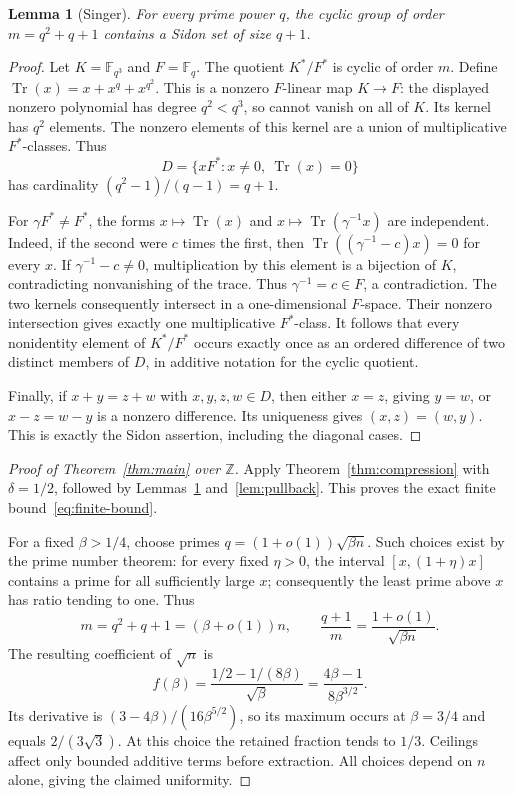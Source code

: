 \documentclass[11pt]{article}
\newtheorem{lemma}[theorem]{Lemma}
\theoremstyle{definition}
\theoremstyle{remark}
\newcommand{\Z}{\mathbb Z}
\newcommand{\F}{\mathbb F}
\DeclareMathOperator{\Tr}{Tr}
\begin{document}
\begin{lemma}[Singer]\label{lem:singer}
For every prime power $q$, the cyclic group of order $m=q^2+q+1$
contains a Sidon set of size $q+1$.
\end{lemma}
\begin{proof}
Let $K=\F_{q^3}$ and $F=\F_q$. The quotient $K^*/F^*$ is cyclic of
order $m$. Define $\Tr(x)=x+x^q+x^{q^2}$. This is a nonzero
$F$-linear map $K\to F$: the displayed nonzero polynomial has degree
$q^2<q^3$, so cannot vanish on all of $K$. Its kernel has $q^2$ elements.
The nonzero elements of this kernel are a union of multiplicative
$F^*$-classes. Thus
\[
D=\{xF^*:x\ne0,\ \Tr(x)=0\}
\]
has cardinality $(q^2-1)/(q-1)=q+1$.

For $\gamma F^*\ne F^*$, the forms $x\mapsto\Tr(x)$ and
$x\mapsto\Tr(\gamma^{-1}x)$ are independent. Indeed, if the second
were $c$ times the first, then
$\Tr((\gamma^{-1}-c)x)=0$ for every $x$. If $\gamma^{-1}-c\ne0$,
multiplication by this element is a bijection of $K$, contradicting
nonvanishing of the trace. Thus $\gamma^{-1}=c\in F$, a contradiction.
The two kernels consequently intersect in a one-dimensional $F$-space.
Their nonzero intersection gives exactly one multiplicative $F^*$-class.
It follows that every nonidentity element of $K^*/F^*$ occurs exactly
once as an ordered difference of two distinct members of $D$, in
additive notation for the cyclic quotient.

Finally, if $x+y=z+w$ with $x,y,z,w\in D$, then either $x=z$, giving
$y=w$, or $x-z=w-y$ is a nonzero difference. Its uniqueness gives
$(x,z)=(w,y)$. This is exactly the Sidon assertion, including the
diagonal cases.
\end{proof}

\begin{proof}[Proof of Theorem~\ref{thm:main} over $\Z$]
Apply Theorem~\ref{thm:compression} with $\delta=1/2$, followed by
Lemmas~\ref{lem:singer} and~\ref{lem:pullback}. This proves the exact
finite bound~\eqref{eq:finite-bound}.

For a fixed $\beta>1/4$, choose primes
$q=(1+o(1))\sqrt{\beta n}$. Such choices exist by the prime number
theorem: for every fixed $\eta>0$, the interval $[x,(1+\eta)x]$
contains a prime for all sufficiently large $x$; consequently the least
prime above $x$ has ratio tending to one. Thus
\[
m=q^2+q+1=(\beta+o(1))n,\qquad
\frac{q+1}{m}=\frac{1+o(1)}{\sqrt{\beta n}}.
\]
The resulting coefficient of $\sqrt n$ is
\[
f(\beta)=\frac{1/2-1/(8\beta)}{\sqrt\beta}
=\frac{4\beta-1}{8\beta^{3/2}}.
\]
Its derivative is $(3-4\beta)/(16\beta^{5/2})$, so its maximum occurs
at $\beta=3/4$ and equals $2/(3\sqrt3)$.
At this choice the retained fraction tends to $1/3$.
Ceilings affect only bounded additive terms before extraction. All
choices depend on $n$ alone, giving the claimed uniformity.
\end{proof}
\end{document}
